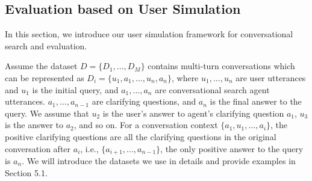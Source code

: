 \documentclass[format=acmsmall, review=False, screen=true]{acmart}
\begin{document}
\subsection{Evaluation based on User Simulation}
In this section, we introduce our user simulation framework for conversational search and evaluation. 

Assume the dataset $D=\{D_1,...,D_M\}$ contains multi-turn conversations which can be represented as $D_{i}=\{u_1,a_1, ...,u_n,a_n\}$, where $u_1,...,u_n$ are user utterances and $u_1$ is the initial query, and $a_1,...,a_n$ are conversational search agent utterances. $a_1,...,a_{n-1}$ are clarifying questions, and $a_n$ is the final answer to the query. We assume that $u_2$ is the user's answer to agent's clarifying question $a_1$, $u_3$ is the answer to $a_2$, and so on. For a conversation context $\{a_1, u_1, ..., a_i\}$, the positive clarifying questions are all the clarifying questions in the original conversation after $a_i$, i.e., $\{a_{i+1},...,a_{n-1}\}$, the only positive answer to the query is $a_n$. We will introduce the datasets we use in details and provide examples in Section 5.1.
\end{document}
